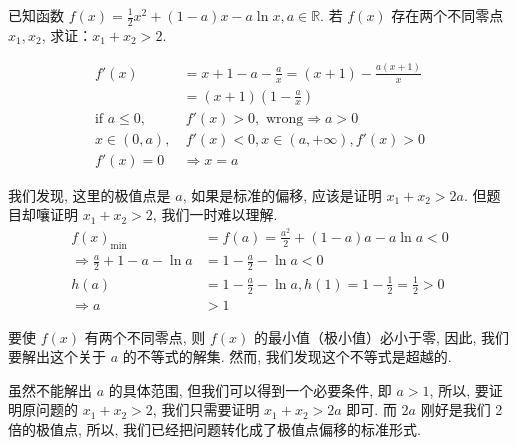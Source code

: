 \begin{example}
    已知函数 $f(x) = \frac{1}{2}x^2 + (1-a)x - a\ln x, a \in \mathbb{R}$.
若 $f(x)$ 存在两个不同零点 $x_1, x_2$, 求证：$x_1 + x_2 > 2$. 
\end{example}
\begin{jie}
    \begin{align*}
        f'(x) &= x + 1 - a - \frac{a}{x} = (x + 1) - \frac{a(x + 1)}{x} \\
        &= (x + 1)\left(1 - \frac{a}{x}\right) \\
        \text{if } a \leqslant 0, & \ f'(x) > 0, \text{ wrong} \Rightarrow a > 0 \\
        x \in (0, a), & \ f'(x) < 0, x \in (a, +\infty), f'(x) > 0 \\
        f'(x) = 0 & \Rightarrow x = a
        \end{align*}
        
        我们发现, 这里的极值点是 $a$, 如果是标准的偏移, 应该是证明 $x_1 + x_2 > 2a$. 但题目却嚷证明 $x_1 + x_2 > 2$, 我们一时难以理解. 
        \begin{align*}
            f(x)_{\min} &= f(a) = \frac{a^2}{2} + (1-a)a - a\ln a < 0 \\
            \Rightarrow \frac{a}{2} + 1 - a - \ln a &= 1 - \frac{a}{2} - \ln a < 0 \\
            h(a) &= 1 - \frac{a}{2} - \ln a, h(1) = 1 - \frac{1}{2} = \frac{1}{2} > 0 \\
            \Rightarrow a &> 1
            \end{align*}
            
            要使 $f(x)$ 有两个不同零点, 则 $f(x)$ 的最小值（极小值）必小于零, 因此, 我们要解出这个关于 $a$ 的不等式的解集. 然而, 我们发现这个不等式是超越的. 
            
            虽然不能解出 $a$ 的具体范围, 但我们可以得到一个必要条件, 即 $a > 1$, 所以, 要证明原问题的 $x_1 + x_2 > 2$, 我们只需要证明 $x_1 + x_2 > 2a$ 即可. 而 $2a$ 刚好是我们 2 倍的极值点, 所以, 我们已经把问题转化成了极值点偏移的标准形式. 
            

\end{jie}
